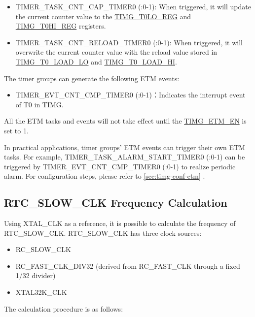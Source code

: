 \documentclass[main\_\_EN.tex]{subfiles}
\begin{document}
\begin{itemize}
\item TIMER\_TASK\_CNT\_CAP\_TIMER0 (:0-1): When triggered, it will update the current counter value to the \hyperref[regdesc:TIMGTXLOREG]{TIMG\_T0LO\_REG} and \hyperref[regdesc:TIMGTXHIREG]{TIMG\_T0HI\_REG} registers.
\item TIMER\_TASK\_CNT\_RELOAD\_TIMER0 (:0-1): When triggered, it will overwrite the current counter value with the reload value stored in \hyperref[fielddesc:TIMGTXLOADLO]{TIMG\_T0\_LOAD\_LO} and \hyperref[fielddesc:TIMGTXLOADHI]{TIMG\_T0\_LOAD\_HI}.

\end{itemize}


The timer groups can generate the following ETM events:

\begin{itemize}
\item TIMER\_EVT\_CNT\_CMP\_TIMER0 (:0-1)：Indicates the interrupt event of T0 in TIMG.
\end{itemize}

All the ETM tasks and events will not take effect until the \hyperref[fielddesc:TIMGETMEN]{TIMG\_ETM\_EN} is set to 1.

In practical applications, timer groups' ETM events can trigger their own ETM tasks. For example, TIMER\_TASK\_ALARM\_START\_TIMER0 (:0-1) can be triggered by TIMER\_EVT\_CNT\_CMP\_TIMER0 (:0-1) to realize periodic alarm. For configuration steps, please refer to \ref{sec:timg-conf-etm} .


\subsection{RTC\_SLOW\_CLK Frequency Calculation}\label{sec:rtc-calibration-desc}

Using XTAL\_CLK as a reference, it is possible to calculate the frequency of RTC\_SLOW\_CLK. RTC\_SLOW\_CLK has three clock sources:

\begin{itemize}
    \item RC\_SLOW\_CLK
    \item RC\_FAST\_CLK\_DIV32 (derived from RC\_FAST\_CLK through a fixed 1/32 divider)
    \item XTAL32K\_CLK
\end{itemize}

The calculation procedure is as follows:
\end{document}

